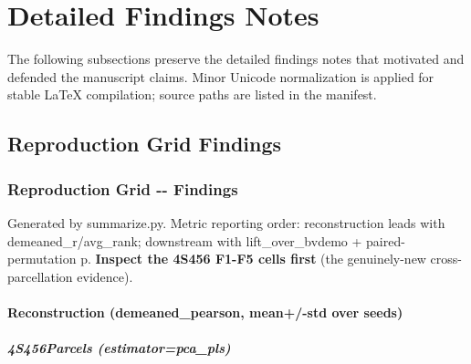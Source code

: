 \section{Detailed Findings Notes}\label{detailed-findings-notes}

The following subsections preserve the detailed findings notes that motivated and defended the manuscript claims. Minor Unicode normalization is applied for stable LaTeX compilation; source paths are listed in the manifest.

\subsection{Reproduction Grid Findings}\label{reproduction-grid-findings}

\subsubsection{Reproduction Grid -\/- Findings}\label{reproduction-grid----findings}

Generated by summarize.py. Metric reporting order: reconstruction leads with demeaned\_r/avg\_rank; downstream with lift\_over\_bvdemo + paired-permutation p. \textbf{Inspect the 4S456 F1-F5 cells first} (the genuinely-new cross-parcellation evidence).

\paragraph{Reconstruction (demeaned\_pearson, mean+/-std over seeds)}\label{reconstruction-demeaned_pearson-mean-std-over-seeds}

\subparagraph{4S456Parcels (estimator=pca\_pls)}\label{4s456parcels-estimatorpca_pls}

